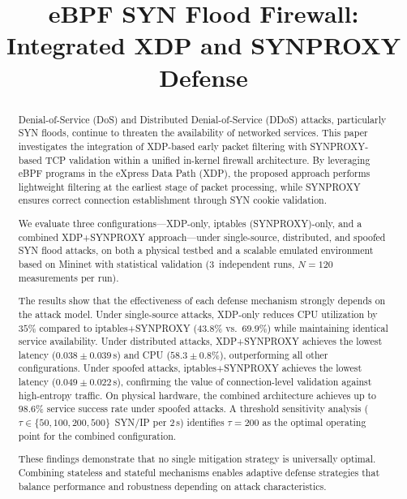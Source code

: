 \documentclass[conference]{IEEEtran}
\begin{document}
\title{eBPF SYN Flood Firewall: Integrated XDP and SYNPROXY Defense\\}

\author{
}

\maketitle

\begin{abstract}
Denial-of-Service (DoS) and Distributed Denial-of-Service (DDoS) attacks,
particularly SYN floods, continue to threaten the availability of networked
services.
This paper investigates the integration of XDP-based early packet filtering
with SYNPROXY-based TCP validation within a unified in-kernel firewall
architecture.
By leveraging eBPF programs in the eXpress Data Path (XDP), the proposed
approach performs lightweight filtering at the earliest stage of packet
processing, while SYNPROXY ensures correct connection establishment through
SYN cookie validation.

We evaluate three configurations---XDP-only, iptables (SYNPROXY)-only, and
a combined XDP+SYNPROXY approach---under single-source, distributed, and
spoofed SYN flood attacks, on both a physical testbed and a scalable
emulated environment based on Mininet with statistical validation
(3~independent runs, $N=120$ measurements per run).

The results show that the effectiveness of each defense mechanism strongly
depends on the attack model.
Under single-source attacks, XDP-only reduces CPU utilization by $35$\%
compared to iptables+SYNPROXY ($43.8$\% vs.\ $69.9$\%) while maintaining
identical service availability.
Under distributed attacks, XDP+SYNPROXY achieves the lowest latency
($0.038 \pm 0.039$\,s) and CPU ($58.3 \pm 0.8$\%), outperforming all
other configurations.
Under spoofed attacks, iptables+SYNPROXY achieves the lowest latency
($0.049 \pm 0.022$\,s), confirming the value of connection-level validation
against high-entropy traffic.
On physical hardware, the combined architecture achieves up to $98.6$\%
service success rate under spoofed attacks.
A threshold sensitivity analysis ($\tau \in \{50,100,200,500\}$~SYN/IP
per 2\,s) identifies $\tau=200$ as the optimal operating point for the
combined configuration.

These findings demonstrate that no single mitigation strategy is
universally optimal.
Combining stateless and stateful mechanisms enables adaptive defense
strategies that balance performance and robustness depending on attack
characteristics.
\end{abstract}
\end{document}
